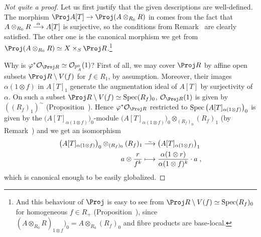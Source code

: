 \documentclass[a4paper,parskip=half,numbers=enddot, DIV=12]{scrreprt}
\begin{document}
\begin{proof}[Not quite a proof]
	Let us first justify that the given descriptions are well-defined. The morphism $\Proj A[T]\morphism \Proj(A\otimes_{R_0}R)$ in  comes from the fact that $A\otimes_{R_0}R\morphism[\alpha]A[T]$ is surjective, so the conditions from Remark~ are clearly satisfied. The other one is the canonical morphism we get from $\Proj(A\otimes_{R_0}R)\simeq X\times_S\Proj R$.\footnote{And this behaviour of $\Proj$ is easy to see from $\Proj R\setminus V(f)\simeq \Spec (R_f)_0$ for homogeneous $f\in R_+$ (Proposition~), since $(A\otimes_{R_0}R)_{1\otimes f})_0=A\otimes_{R_0}(R_f)_0$ and fibre products are base-local.} 
	
	Why is $\phi^*\Oo_{\Proj R}\simeq \Oo_{\IP_A^0}(1)$? First of all, we may cover $\Proj R$ by affine open subsets $\Proj R\setminus V(f)$ for $f\in R_1$, by assumption. Moreover, their images $\alpha(1\otimes f)$ in $A[T]_1$ generate the augmentation ideal of $A[T]$ by surjectivity of $\alpha$. On such a subset $\Proj R\setminus V(f)\simeq \Spec (R_f)_0$, $\Oo_{\Proj R}(1)$ is given by $((R_f)_1)^\sim$ (Proposition~). Hence $\phi^*\Oo_{\Proj R}$ restricted to $\operatorname{Spec} \big(A[T]_{\alpha(1\otimes f)}\big)_0$ is given by the $\big(A[T]_{\alpha(1\otimes f)}\big)_0$-module $\big(A[T]_{\alpha(1\otimes f)}\big)_0\otimes_{(R_f)_0}(R_f)_1$ (by Remark~) and we get an isomorphism
	\begin{align*}
		\big(A[T]_{\alpha(1\otimes f)}\big)_0\otimes_{(R_f)_0}(R_f)_1&\isomorphism \big(A[T]_{\alpha(1\otimes f)}\big)_1\\
		a \otimes \frac{r}{f^k}&\longmapsto \frac{\alpha(1\otimes r)}{\alpha(1\otimes f)^k}\cdot a\;,
	\end{align*}
	which is canonical enough to be easily globalized.
	

\end{proof}
\end{document}
